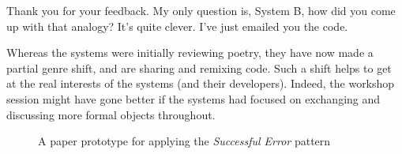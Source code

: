 \begin{center}
\begin{minipage}{.9\columnwidth}
\begin{dialogue}
 Thank you for your feedback.  My only question is, System
B, how did you come up with that analogy?  It's quite clever.
%
 I've just emailed you the code.
\end{dialogue}
\end{minipage}
\end{center}

Whereas the systems were initially reviewing poetry, they have now
made a partial genre shift, and are sharing and remixing code.  Such a
shift helps to get at the real interests of the systems (and their
developers).  Indeed, the workshop session might have gone better if
the systems had focused on exchanging and discussing more formal
objects throughout.

\begin{figure*}[t]
\begin{center}
\end{center}
\caption{A paper prototype for applying the \emph{Successful Error} pattern\label{fig:paper-prototype}}
\end{figure*}

